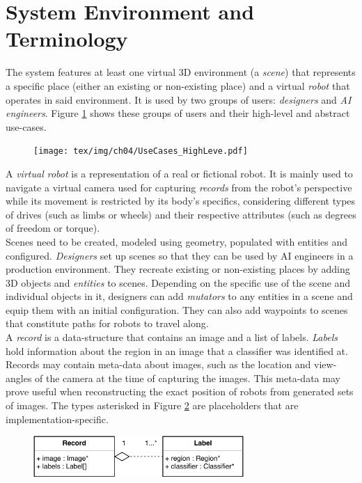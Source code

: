 \section{System Environment and Terminology}
The system features at least one virtual 3D environment (a \emph{scene}) that represents a specific place (either an existing or non-existing place) and a virtual \emph{robot} that operates in said environment. It is used by two groups of users: \emph{designers} and \emph{\ac{AI} engineers}. Figure \ref{fig:use-cases-abstract} shows these groups of users and their high-level and abstract use-cases.
\begin{figure}[t]
    \centering
    \texttt{[image: tex/img/ch04/UseCases\_HighLeve.pdf]}
    \label{fig:use-cases-abstract}
\end{figure}
A \emph{virtual robot} is a representation of a real or fictional robot. It is mainly used to navigate a virtual camera used for capturing \emph{records} from the robot's perspective while its movement is restricted by its body's specifics, considering different types of drives (such as limbs or wheels) and their respective attributes (such as degrees of freedom or torque).\\
Scenes need to be created, modeled using geometry, populated with entities and configured. \emph{Designers} set up scenes so that they can be used by \acs{AI} engineers in a production environment. They recreate existing or non-existing places by adding 3D objects and \emph{entities} to scenes. Depending on the specific use of the scene and individual objects in it, designers can add \emph{mutators} to any entities in a scene and equip them with an initial configuration. They can also add waypoints to scenes that constitute paths for robots to travel along.\\
A \emph{record} is a data-structure that contains an image and a list of labels. \emph{Labels} hold information about the region in an image that a classifier was identified at. Records may contain meta-data about images, such as the location and view-angles of the camera at the time of capturing the images. This meta-data may prove useful when reconstructing the exact position of robots from generated sets of images. The types asterisked in Figure \ref{fig:classes-record} are placeholders that are implementation-specific.
\begin{figure}[b]
    \centering
    \includegraphics[width=8cm]{tex/img/ch04/Classes_Record.pdf}
    \label{fig:classes-record}
\end{figure}
